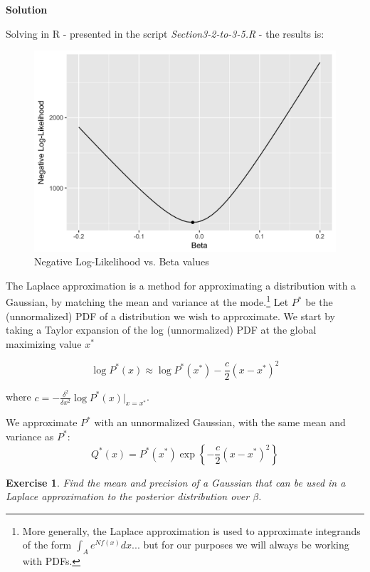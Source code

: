 \documentclass[twoside]{article}
\newcounter{lecnum}
\newtheorem{exercise}{Exercise}[lecnum]
\begin{document}
{\color{blue}
	\textbf{Solution}
	
Solving in R - presented in the script \textit{Section3-2-to-3-5.R} - the results is:

\begin{figure}[H]
	\begin{center}
		\includegraphics[width=.8\linewidth]{Section3R/Figures/P3_3_logl.png}
		\caption{Negative Log-Likelihood vs. Beta values}
	\end{center}
\end{figure}
	
} %

The Laplace approximation is a method for approximating a distribution with a Gaussian, by matching the mean and variance at the mode.\footnote{More generally, the Laplace approximation is used to approximate integrands of the form $\int_A e^{Nf(x)} dx$... but for our purposes we will always be working with PDFs.} Let $P^*$ be the (unnormalized) PDF  of a distribution we wish to approximate. We start by taking a Taylor expansion of the log (unnormalized) PDF at the global maximizing value $x^*$

$$\log P^*(x) \approx \log P^*(x^*) - \frac{c}{2}(x-x^*)^2$$

where $c = -\frac{\delta^2}{\delta x^2}\log P^*(x)\Big\rvert_{x=x^*}$.

We approximate $P^*$ with an unnormalized Gaussian, with the same mean and variance as $P^*$:
$$Q^*(x) = P^*(x^*)\exp\left\{-\frac{c}{2}(x-x^*)^2\right\}$$




\begin{exercise}
  Find the mean and precision of a Gaussian that can be used in a Laplace approximation to the posterior distribution over $\beta$.
\end{exercise}
\end{document}
